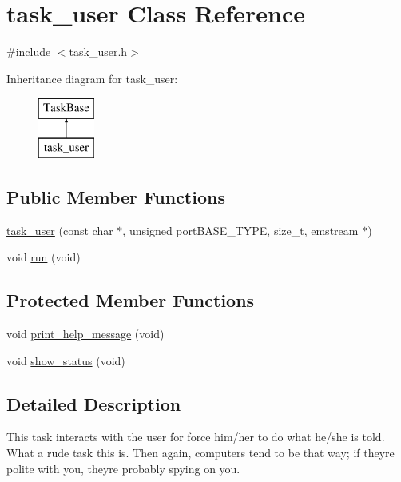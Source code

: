\hypertarget{classtask__user}{}\section{task\+\_\+user Class Reference}
\label{classtask__user}


{\ttfamily \#include $<$task\+\_\+user.\+h$>$}

Inheritance diagram for task\+\_\+user\+:\begin{figure}[H]
\begin{center}
\leavevmode
\includegraphics[height=2.000000cm]{classtask__user}
\end{center}
\end{figure}
\subsection*{Public Member Functions}
\begin{DoxyCompactItemize}
\item 
\mbox{\hyperlink{classtask__user_a3aba77563b375bb14838800608da48bc}{task\+\_\+user}} (const char $\ast$, unsigned port\+B\+A\+S\+E\+\_\+\+T\+Y\+PE, size\+\_\+t, emstream $\ast$)
\item 
void \mbox{\hyperlink{classtask__user_adca6429d57be25e8d411414fc8ad75af}{run}} (void)
\end{DoxyCompactItemize}
\subsection*{Protected Member Functions}
\begin{DoxyCompactItemize}
\item 
void \mbox{\hyperlink{classtask__user_a75475060f83bae1e44bcc8a5c34015c7}{print\+\_\+help\+\_\+message}} (void)
\item 
void \mbox{\hyperlink{classtask__user_a105bebbd9cb1031154c3dfc3662db4a0}{show\+\_\+status}} (void)
\end{DoxyCompactItemize}


\subsection{Detailed Description}
This task interacts with the user for force him/her to do what he/she is told. What a rude task this is. Then again, computers tend to be that way; if they\textquotesingle{}re polite with you, they\textquotesingle{}re probably spying on you. 

